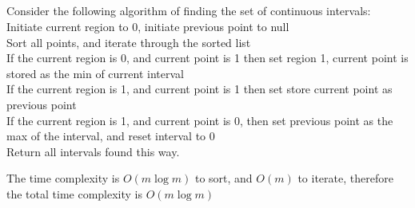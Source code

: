 \documentclass[11pt, oneside]{article}   	%
\begin{document}
\subsection{}
Consider the following algorithm of finding the set of continuous intervals:\\

\indent Initiate current region to 0, initiate previous point to null\\
\indent Sort all points, and iterate through the sorted list\\
\indent If the current region is 0, and current point is 1 then set region 1, current point is stored as the min of current interval\\
\indent If the current region is 1, and current point is 1 then set store current point as previous point\\
\indent If the current region is 1, and current point is 0, then set previous point as the max of the interval, and reset interval to 0\\
\indent Return all intervals found this way.

\indent The time complexity is $O(m\log m)$ to sort, and $O(m)$ to iterate, therefore the total time complexity is $O(m\log m)$\\
\end{document}
